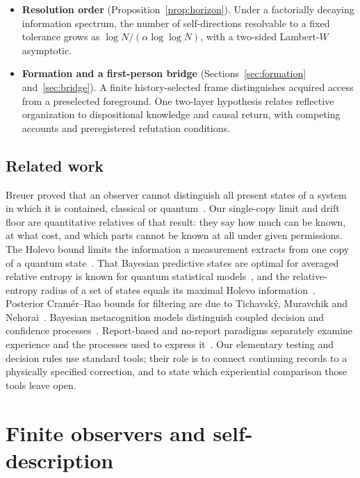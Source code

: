 \documentclass[12pt]{article}
\theoremstyle{definition}
\theoremstyle{remark}
\begin{document}
\begin{itemize}[itemsep=2pt]
\item \textbf{Resolution order} (Proposition~\ref{prop:horizon}). Under a factorially decaying information spectrum, the number of self-directions resolvable to a fixed tolerance grows as $\log N/(\alpha\log\log N)$, with a two-sided Lambert-$W$ asymptotic.
\item \textbf{Formation and a first-person bridge}
(Sections~\ref{sec:formation} and~\ref{sec:bridge}).
A finite history-selected frame distinguishes acquired access from a
preselected foreground. One two-layer hypothesis relates reflective
organization to dispositional knowledge and causal return, with
competing accounts and preregistered refutation conditions.
\end{itemize}

\subsection{Related work}

Breuer proved that an observer cannot distinguish all present states of a system in which it is contained, classical or quantum~\cite{Breuer1995}. Our single-copy limit and drift floor are quantitative relatives of that result: they say how much can be known, at what cost, and which parts cannot be known at all under given permissions. The Holevo bound limits the information a measurement extracts from one copy of a quantum state~\cite{Holevo1973}. That Bayesian predictive states are optimal for averaged relative entropy is known for quantum statistical models~\cite{TanakaKomaki2005}, and the relative-entropy radius of a set of states equals its maximal Holevo information~\cite{SchumacherWestmoreland2001}. Posterior Cram\'er--Rao bounds for filtering are due to Tichavsk\'y, Muravchik and Nehorai~\cite{Tichavsky1998}. Bayesian metacognition models distinguish coupled decision and confidence processes~\cite{FlemingDaw2017}. Report-based and no-report paradigms separately examine experience and the processes used to express it~\cite{Tsuchiya2015}. Our elementary testing and decision rules use standard tools; their role is to connect continuing records to a physically specified correction, and to state which experiential comparison those tools leave open.

\section{Finite observers and self-description}\label{sec:2}
\end{document}
